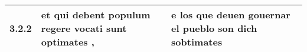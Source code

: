 \begin{tabular}{|p{1cm}|p{6.5cm}|p{6.5cm}|}

\hline
3.2.2 & et qui debent populum regere vocati sunt optimates , & e los que deuen gouernar el pueblo son dich sobtimates \\\hline

\end{tabular}
